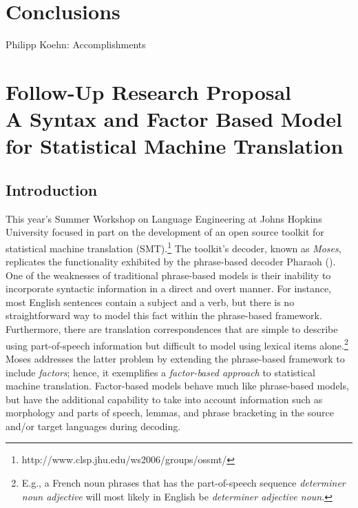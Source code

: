 \documentclass[11pt]{report}
\theoremstyle{plain}
\begin{document}
{\chapter{Conclusions}
{\sc Philipp Koehn: Accomplishments}

\appendix

\chapter{Follow-Up Research Proposal\\
A Syntax and Factor Based Model for Statistical Machine Translation}

\newcommand{\gen}{\hbox{GEN}}
\newcommand{\rep}{\bar{\phi}}
\newcommand{\Rep}{{\Phi}}
\newcommand{\reals}{\mbox{\msym R}}
\newcommand{\pav}{\bar{\alpha}}
\newcommand{\ip}[2]{{#1} \cdot {#2}}
\def\parcite#1{(\cite{#1})}
\def\perscite#1{\cite{#1}} %

\section{Introduction}
\label{intro}

This year's Summer Workshop on Language Engineering at Johns Hopkins
University focused in part on the development of an open source
toolkit for statistical machine translation
(SMT).\footnote{http://www.clsp.jhu.edu/ws2006/groups/ossmt/} The
toolkit's decoder, known as {\em Moses}, replicates the functionality
exhibited by the phrase-based decoder Pharaoh \parcite{koe:04}. One of
the weaknesses of traditional phrase-based models is their inability
to incorporate syntactic information in a direct and overt manner. For
instance, most English sentences contain a subject and a verb, but
there is no straightforward way to model this fact within the
phrase-based framework. Furthermore, there are translation
correspondences that are simple to describe using part-of-speech
information but difficult to model using lexical items
alone.\footnote{E.g., a French noun phrases that has the
part-of-speech sequence {\em determiner noun adjective} will most
likely in English be {\em determiner adjective noun}.} Moses addresses
the latter problem by extending the phrase-based framework to include
{\em factors}; hence, it exemplifies a {\em factor-based approach} to
statistical machine translation. Factor-based models behave much like
phrase-based models, but have the additional capability to take into
account information such as morphology and parts of speech, lemmas,
and phrase bracketing in the source and/or target languages during
decoding.

}
\end{document}
